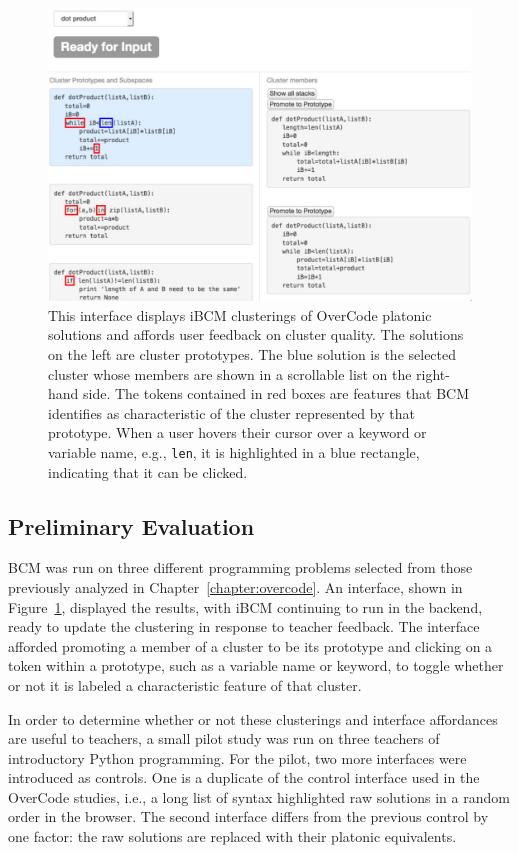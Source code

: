 \begin{figure}[ht]
\includegraphics[width=0.75\columnwidth]{Body/figures/grovercode/overcode_ibcm}
\caption{This interface displays iBCM clusterings of OverCode platonic solutions and affords user feedback on cluster quality. The solutions on the left are cluster prototypes. The blue solution is the selected cluster whose members are shown in a scrollable list on the right-hand side. The tokens contained in red boxes are features that BCM identifies as characteristic of the cluster represented by that prototype. When a user hovers their cursor over a keyword or variable name, e.g., \texttt{len}, it is highlighted in a blue rectangle, indicating that it can be clicked.}
\label{overcode_ibcm}
\end{figure}

\subsection{Preliminary Evaluation}

BCM was run on three different programming problems selected from those previously analyzed in Chapter~\ref{chapter:overcode}. An interface, shown in Figure~\ref{overcode_ibcm}, displayed the results, with iBCM continuing to run in the backend, ready to update the clustering in response to teacher feedback. The interface afforded promoting a member of a cluster to be its prototype and clicking on a token within a prototype, such as a variable name or keyword, to toggle whether or not it is labeled a characteristic feature of that cluster.

In order to determine whether or not these clusterings and interface affordances are useful to teachers, a small pilot study was run on three teachers of introductory Python programming. For the pilot, two more interfaces were introduced as controls. One is a duplicate of the control interface used in the OverCode studies, i.e., a long list of syntax highlighted raw solutions in a random order in the browser. The second interface differs from the previous control by one factor: the raw solutions are replaced with their platonic equivalents.

